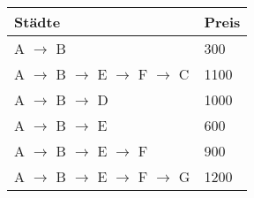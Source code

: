 \documentclass{lehramt-informatik-aufgabe}
\begin{document}
\noindent
\begin{tabular}{|l|l|}
\hline
Städte & Preis\\\hline\hline
A $\rightarrow$ B & 300 \\\hline
A $\rightarrow$ B $\rightarrow$ E $\rightarrow$ F $\rightarrow$ C & 1100 \\\hline
A $\rightarrow$ B $\rightarrow$ D & 1000 \\\hline
A $\rightarrow$ B $\rightarrow$ E & 600 \\\hline
A $\rightarrow$ B $\rightarrow$ E $\rightarrow$ F & 900 \\\hline
A $\rightarrow$ B $\rightarrow$ E $\rightarrow$ F $\rightarrow$ G & 1200 \\\hline
\end{tabular}
\end{document}
